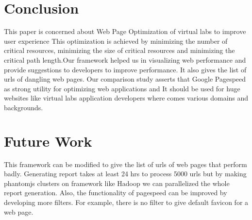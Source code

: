 \documentclass[conference]{IEEEtran}
\begin{document}
\section{Conclusion}
\label{sec-7}
This paper is concerned about Web Page Optimization of virtual labs to improve user experience 
This optimization is achieved by minimizing the number of critical resources, minimizing the size of
critical resources and minimizing the critical path length.Our framework helped us in visualizing web performance and
provide suggestions to developers to improve performance. It also gives the list of urls of dangling web pages.
Our comparison study asserts that Google Pagespeed as strong utility for optimizing web applications and 
It should be used for huge websites like virtual labs
application developers where comes various domains and backgrounds.
 
\section{Future Work}\label{sec-8}
This framework can be modified to give the list of urls of web pages that perform badly.
Generating report takes at least 24 hrs to process 5000 urls but by
making phantomjs clusters on framework like Hadoop we can parallelized the whole report generation.
Also, the functionality of pagespeed can be improved by developing more filters. For example, there is no filter to give default
favicon for a web page.
\end{document}
